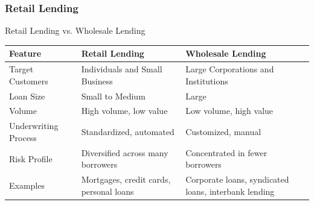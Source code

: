 \documentclass[aspectratio=169,xcolor=dvipsnames]{beamer}
\begin{document}

\begin{frame}
\frametitle{Retail Lending}


Retail Lending vs. Wholesale Lending \\

\begin{table}[H]
\centering
\begin{tabular}{@{}p{3.5cm}p{4.5cm}p{4.5cm}@{}}
\toprule
\textbf{Feature} & \textbf{Retail Lending} & \textbf{Wholesale Lending} \\ 
\midrule
Target Customers & Individuals and Small Business & Large Corporations and Institutions\\
\hline 
Loan Size & Small to Medium & Large \\
\hline 
Volume & High volume, low value & Low volume, high value \\
\hline 
Underwriting Process & Standardized, automated & Customized, manual \\
\hline 
Risk Profile & Diversified across many borrowers & Concentrated in fewer borrowers \\
\hline 
Examples & Mortgages, credit cards, personal loans & Corporate loans, syndicated loans, interbank lending \\ 
\bottomrule
\end{tabular}
\end{table}


	
\end{frame} 




\end{document}
